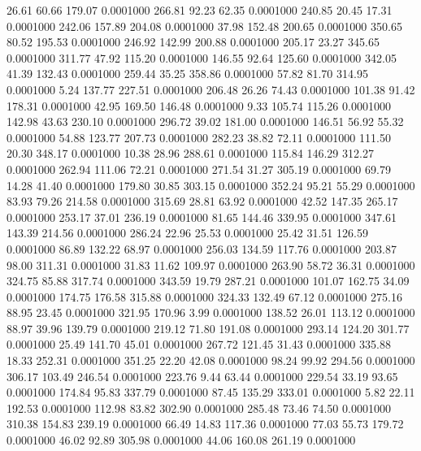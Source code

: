   26.61   60.66  179.07   0.0001000
 266.81   92.23   62.35   0.0001000
 240.85   20.45   17.31   0.0001000
 242.06  157.89  204.08   0.0001000
  37.98  152.48  200.65   0.0001000
 350.65   80.52  195.53   0.0001000
 246.92  142.99  200.88   0.0001000
 205.17   23.27  345.65   0.0001000
 311.77   47.92  115.20   0.0001000
 146.55   92.64  125.60   0.0001000
 342.05   41.39  132.43   0.0001000
 259.44   35.25  358.86   0.0001000
  57.82   81.70  314.95   0.0001000
   5.24  137.77  227.51   0.0001000
 206.48   26.26   74.43   0.0001000
 101.38   91.42  178.31   0.0001000
  42.95  169.50  146.48   0.0001000
   9.33  105.74  115.26   0.0001000
 142.98   43.63  230.10   0.0001000
 296.72   39.02  181.00   0.0001000
 146.51   56.92   55.32   0.0001000
  54.88  123.77  207.73   0.0001000
 282.23   38.82   72.11   0.0001000
 111.50   20.30  348.17   0.0001000
  10.38   28.96  288.61   0.0001000
 115.84  146.29  312.27   0.0001000
 262.94  111.06   72.21   0.0001000
 271.54   31.27  305.19   0.0001000
  69.79   14.28   41.40   0.0001000
 179.80   30.85  303.15   0.0001000
 352.24   95.21   55.29   0.0001000
  83.93   79.26  214.58   0.0001000
 315.69   28.81   63.92   0.0001000
  42.52  147.35  265.17   0.0001000
 253.17   37.01  236.19   0.0001000
  81.65  144.46  339.95   0.0001000
 347.61  143.39  214.56   0.0001000
 286.24   22.96   25.53   0.0001000
  25.42   31.51  126.59   0.0001000
  86.89  132.22   68.97   0.0001000
 256.03  134.59  117.76   0.0001000
 203.87   98.00  311.31   0.0001000
  31.83   11.62  109.97   0.0001000
 263.90   58.72   36.31   0.0001000
 324.75   85.88  317.74   0.0001000
 343.59   19.79  287.21   0.0001000
 101.07  162.75   34.09   0.0001000
 174.75  176.58  315.88   0.0001000
 324.33  132.49   67.12   0.0001000
 275.16   88.95   23.45   0.0001000
 321.95  170.96    3.99   0.0001000
 138.52   26.01  113.12   0.0001000
  88.97   39.96  139.79   0.0001000
 219.12   71.80  191.08   0.0001000
 293.14  124.20  301.77   0.0001000
  25.49  141.70   45.01   0.0001000
 267.72  121.45   31.43   0.0001000
 335.88   18.33  252.31   0.0001000
 351.25   22.20   42.08   0.0001000
  98.24   99.92  294.56   0.0001000
 306.17  103.49  246.54   0.0001000
 223.76    9.44   63.44   0.0001000
 229.54   33.19   93.65   0.0001000
 174.84   95.83  337.79   0.0001000
  87.45  135.29  333.01   0.0001000
   5.82   22.11  192.53   0.0001000
 112.98   83.82  302.90   0.0001000
 285.48   73.46   74.50   0.0001000
 310.38  154.83  239.19   0.0001000
  66.49   14.83  117.36   0.0001000
  77.03   55.73  179.72   0.0001000
  46.02   92.89  305.98   0.0001000
  44.06  160.08  261.19   0.0001000
